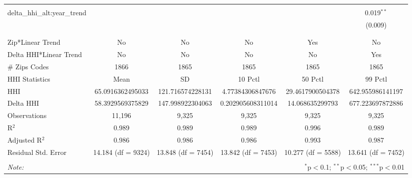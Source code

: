 \begin{table}[H]
{\begin{tabular}{@{\extracolsep{5pt}}lccccc}
   & & & & & \\  

  delta\_hhi\_alt:year\_trend &  &  &  &  & 0.019$^{**}$ \\  

   &  &  &  &  & (0.009) \\  

   & & & & & \\  

 \hline \\[-1.8ex]  

 Zip*Linear Trend & No & No & No & Yes & No \\  

 Delta HHI*Linear Trend & No & No & No & No & Yes \\  

 # Zips Codes & 1866 & 1865 & 1865 & 1865 & 1865 \\  

 HHI Statistics & Mean & SD & 10 Pctl & 50 Pctl & 99 Pctl \\  

 HHI & 65.0916362495033 & 121.716574228131 & 4.77384306847676 & 29.4617900504378 & 642.955986141197 \\  

 Delta HHI & 58.3929569375829 & 147.998922304063 & 0.202905608311014 & 14.068635299793 & 677.223697872886 \\  

 Observations & 11,196 & 9,325 & 9,325 & 9,325 & 9,325 \\  

 R$^{2}$ & 0.989 & 0.989 & 0.989 & 0.996 & 0.989 \\  

 Adjusted R$^{2}$ & 0.986 & 0.986 & 0.986 & 0.993 & 0.987 \\  

 Residual Std. Error & 14.184 (df = 9324) & 13.848 (df = 7454) & 13.842 (df = 7453) & 10.277 (df = 5588) & 13.641 (df = 7452) \\  

 \hline  

 \hline \\[-1.8ex]  

 \textit{Note:}  & \multicolumn{5}{r}{$^{*}$p$<$0.1; $^{**}$p$<$0.05; $^{***}$p$<$0.01} \\  

 \end{tabular}}  

 \end{table}  

